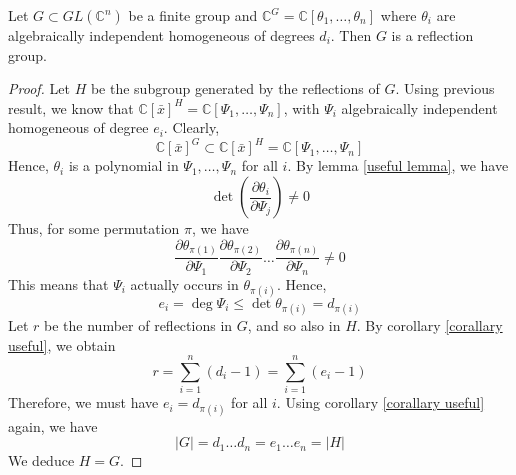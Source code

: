 \documentclass[envcountsame,envcountchap]{svmono}
\begin{document}
\begin{theorem}
Let $G \subset GL(\mathbb{C}^n )$ be a finite group and $\mathbb{C}^G = \mathbb{C}[\theta_1, \ldots , \theta_n ]$ where $\theta_i$ are algebraically independent homogeneous of degrees $d_i$. Then $G$ is a reflection group. 
\label{thm central}
\end{theorem}
\begin{proof}
Let $H$ be the subgroup generated by the reflections of $G$. Using previous result, we know that $\mathbb{C}[\bar{x}]^H = \mathbb{C}[\Psi_1, \ldots , \Psi_n ]$, with $\Psi_i$ algebraically independent homogeneous of degree $e_i$. Clearly,
\begin{equation}
\mathbb{C}[\bar{x}]^G \subset \mathbb{C}[\bar{x}]^H = \mathbb{C}[\Psi_1, \ldots, \Psi_n]
\end{equation} Hence, $\theta_i$ is a polynomial in $\Psi_1, \ldots, \Psi_n$ for all $i$. By lemma \ref{useful lemma}, we have
\begin{equation}
\det \left( \frac{\partial \theta_i}{\partial \Psi_j}\right) \neq 0
\end{equation} Thus, for some permutation $\pi$, we have 
\begin{equation}
\frac{\partial \theta_{\pi(1)}}{\partial \Psi_1} \frac{\partial \theta_{\pi(2)}}{\partial \Psi_2} \ldots \frac{\partial \theta_{\pi(n)}}{\partial \Psi_n} \neq 0
\end{equation} This means that $\Psi_i$ actually occurs in $\theta_{\pi(i)}$. Hence, 
\begin{equation}
e_i = \deg \Psi_i \le \det \theta_{\pi(i)} = d_{\pi(i)}
\end{equation} Let $r$ be the number of reflections in $G$, and so also in $H$. By corollary \ref{corallary useful}, we obtain
\begin{equation}
r = \sum_{i=1}^n (d_i - 1) =  \sum_{i=1}^n (e_i - 1) 
\end{equation} Therefore, we must have $e_i = d_{\pi(i)}$ for all $i$. Using corollary \ref{corallary useful} again, we have
\begin{equation}
|G| = d_1 \ldots d_n = e_1 \ldots e_n = |H|
\end{equation} We deduce $H = G$. 



\end{proof}



\mainmatter%


	
\end{document}
